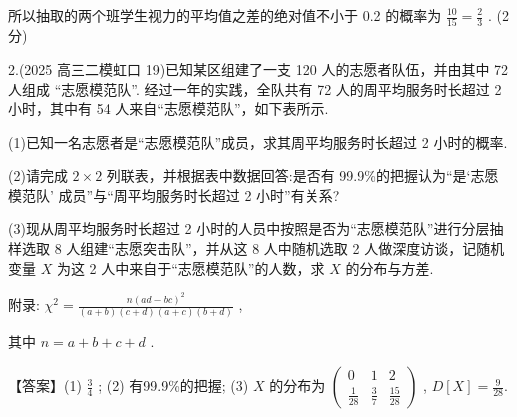 \documentclass[10pt]{article}
\begin{document}
所以抽取的两个班学生视力的平均值之差的绝对值不小于 0.2 的概率为 \(\frac{10}{15} = \frac{2}{3}\) . (2 分)

2.(2025 高三二模虹口 19)已知某区组建了一支 120 人的志愿者队伍，并由其中 72 人组成 “志愿模范队”. 经过一年的实践，全队共有 72 人的周平均服务时长超过 2 小时，其中有 54 人来自“志愿模范队”，如下表所示.

\begin{center}
\end{center}

(1)已知一名志愿者是“志愿模范队”成员，求其周平均服务时长超过 2 小时的概率.

(2)请完成 \(2 \times  2\) 列联表，并根据表中数据回答:是否有 99.9\%的把握认为“是‘志愿模范队’ 成员”与“周平均服务时长超过 2 小时”有关系?

(3)现从周平均服务时长超过 2 小时的人员中按照是否为“志愿模范队”进行分层抽样选取 8 人组建“志愿突击队”，并从这 8 人中随机选取 2 人做深度访谈，记随机变量 \(X\) 为这 2 人中来自于“志愿模范队”的人数，求 \(X\) 的分布与方差.

\begin{center}
\end{center}

附录: \({\chi }^{2} = \frac{n{\left( ad - bc\right) }^{2}}{\left( {a + b}\right) \left( {c + d}\right) \left( {a + c}\right) \left( {b + d}\right) }\) ,

其中 \(n = a + b + c + d\) .

【答案】(1) \(\frac{3}{4}\) ; (2) 有99.9\%的把握; (3) \(X\) 的分布为 \(\left( \begin{matrix} 0 & 1 & 2 \\  \frac{1}{28} & \frac{3}{7} & \frac{15}{28} \end{matrix}\right)\) , \(D\left\lbrack  X\right\rbrack   = \frac{9}{28}.\)
\end{document}
